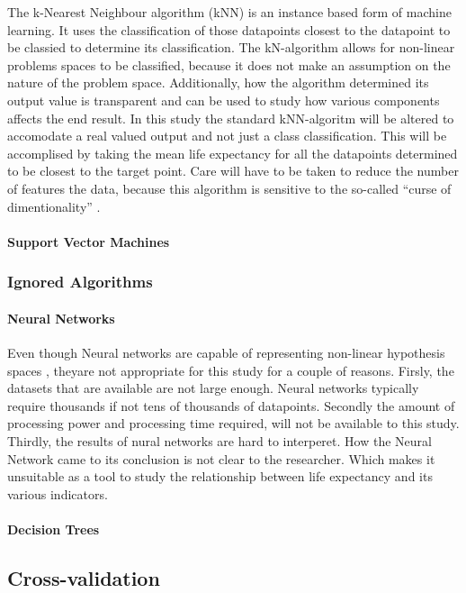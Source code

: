 \documentclass[12pt,a4paper]{article}
\begin{document}
The k-Nearest Neighbour algorithm (kNN) is an instance based form of machine learning. It uses the classification of those datapoints closest to the datapoint to be classied to determine its classification. The kN-algorithm allows for non-linear problems spaces to be classified, because it does not make an assumption on the nature of the problem space. Additionally, how the algorithm determined its output value is transparent and can be used to study how various components affects the end result. In this study the standard kNN-algoritm will be altered to accomodate a real valued output and not just a class classification. This will be accomplised by taking the mean life expectancy for all the datapoints determined to be closest to the target point. Care will have to be taken to reduce the number of features the data, because this algorithm is sensitive to the so-called ``curse of dimentionality'' \citep{Mitchell}.

\paragraph{Support Vector Machines}



\subsubsection{Ignored Algorithms}
\paragraph{Neural Networks}
Even though Neural networks are capable of representing non-linear hypothesis spaces \citep{Mitchell}, theyare not appropriate for this study for a couple of reasons. Firsly, the datasets that are available are not large enough. Neural networks typically require thousands if not tens of thousands of datapoints. Secondly the amount of processing power and processing time required, will not be available to this study. Thirdly, the results of nural networks are hard to interperet. How the Neural Network came to its conclusion is not clear to the researcher. Which makes it unsuitable as a tool to study the relationship between life expectancy and its various indicators.

\paragraph{Decision Trees}

\subsection{Cross-validation}
\end{document}
